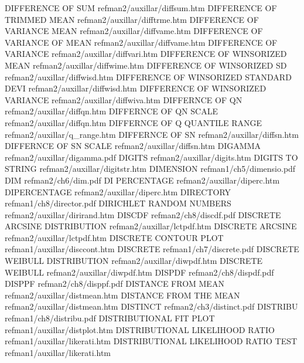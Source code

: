 DIFFERENCE OF SUM                       refman2/auxillar/diffsum.htm
DIFFERENCE OF TRIMMED MEAN              refman2/auxillar/difftrme.htm
DIFFERENCE OF VARIANCE MEAN             refman2/auxillar/diffvame.htm
DIFFERENCE OF VARIANCE OF MEAN          refman2/auxillar/diffvame.htm
DIFFERENCE OF VARIANCE                  refman2/auxillar/diffvari.htm
DIFFERENCE OF WINSORIZED MEAN           refman2/auxillar/diffwime.htm
DIFFERENCE OF WINSORIZED SD             refman2/auxillar/diffwisd.htm
DIFFERENCE OF WINSORIZED STANDARD DEVI  refman2/auxillar/diffwisd.htm
DIFFERENCE OF WINSORIZED VARIANCE       refman2/auxillar/diffwiva.htm
DIFFERNCE OF QN                         refman2/auxillar/diffqn.htm
DIFFERNCE OF QN SCALE                   refman2/auxillar/diffqn.htm
DIFFERNCE OF Q QUANTILE RANGE           refman2/auxillar/q_range.htm
DIFFERNCE OF SN                         refman2/auxillar/diffsn.htm
DIFFERNCE OF SN SCALE                   refman2/auxillar/diffsn.htm
DIGAMMA                                 refman2/auxillar/digamma.pdf
DIGITS                                  refman2/auxillar/digits.htm
DIGITS TO STRING                        refman2/auxillar/digitstr.htm
DIMENSION                               refman1/ch5/dimensio.pdf
DIM                                     refman2/ch6/dim.pdf
DI PERCENTAGE                           refman2/auxillar/diperc.htm
DIPERCENTAGE                            refman2/auxillar/diperc.htm
DIRECTORY                               refman1/ch8/director.pdf
DIRICHLET RANDOM NUMBERS                refman2/auxillar/dirirand.htm
DISCDF                                  refman2/ch8/discdf.pdf
DISCRETE ARCSINE DISTRIBUTION           refman2/auxillar/lctpdf.htm
DISCRETE ARCSINE                        refman2/auxillar/lctpdf.htm
DISCRETE CONTOUR PLOT                   refman1/auxillar/disccont.htm
DISCRETE                                refman1/ch7/discrete.pdf
DISCRETE WEIBULL DISTRIBUTION           refman2/auxillar/diwpdf.htm
DISCRETE WEIBULL                        refman2/auxillar/diwpdf.htm
DISPDF                                  refman2/ch8/dispdf.pdf
DISPPF                                  refman2/ch8/disppf.pdf
DISTANCE FROM MEAN                      refman2/auxillar/distmean.htm
DISTANCE FROM THE MEAN                  refman2/auxillar/distmean.htm
DISTINCT                                refman2/ch3/distinct.pdf
DISTRIBU                                refman1/ch8/distribu.pdf
DISTRIBUTIONAL FIT PLOT                 refman1/auxillar/distplot.htm
DISTRIBUTIONAL LIKELIHOOD RATIO         refman1/auxillar/likerati.htm
DISTRIBUTIONAL LIKELIHOOD RATIO TEST    refman1/auxillar/likerati.htm
